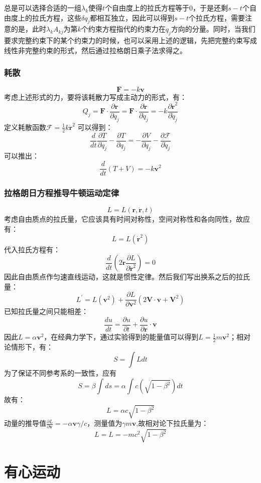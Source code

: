\documentclass[a4paper, 10pt, openany]{book}%
\begin{document}
    总是可以选择合适的一组$\lambda_k$使得$t$个自由度上的拉氏方程等于0，于是还剩$s-t$个自由度上的拉氏方程，这些$\delta q_j$都相互独立，因此可以得到$s-t$个拉氏方程，需要注意的是，此时$\lambda_kA_{kj}$为第$k$个约束方程指代的约束力在$q_j$方向的分量。同时，当我们要求完整约束下的某个约束力的时候，也可以采用上述的逻辑，先把完整约束写成线性非完整约束的形式，然后通过拉格朗日乘子法求得之。
     \subsection{耗散}
    $$\textbf{F}=-k\textbf{v}$$
    考虑上述形式的力，要将该耗散力写成主动力的形式，有：
     $$Q_j=\textbf{F}\cdot\frac{\partial \textbf{r}}{\partial q_j}=\textbf{F}\cdot\frac{\partial \dot{\textbf{r}}}{\partial \dot{q}_j}=-k\frac{\partial \dot{\textbf{r}}^2}{\partial \dot{q}_j}$$
    定义耗散函数$\mathcal{F}=\frac{1}{2}k\dot{\textbf{r}}^2$  可以得到：
    $$\frac{d}{dt}\frac{\partial T}{\partial \dot{q}_j}-\frac{\partial T}{\partial q_j}=-\frac{\partial V}{\partial \dot{q}_j}-\frac{\partial \mathcal{F}}{\partial \dot{q}_j}$$
    可以推出：
    $$\frac{d}{dt}(T+V)=-k\textbf{v}^2$$
    \subsection{拉格朗日方程推导牛顿运动定律}
    $$L=L(\textbf{r},\dot{\textbf{r}},t)$$
    考虑自由质点的拉氏量，它应该具有时间对称性，空间对称性和各向同性，故应有：
    $$L=L(\dot{\textbf{r}}^2)$$
    代入拉氏方程有：
    $$\frac{d}{dt}(2\dot{\textbf{r}}\frac{\partial L}{\partial \dot{\textbf{r}}^2})=0$$
    因此自由质点作匀速直线运动，这就是惯性定律。然后我们写出换系之后的拉氏量：
    $$L^\prime=L(\textbf{v}^2)+\frac{\partial L}{\partial \textbf{v}^2}(2\textbf{V}\cdot\textbf{v}+\textbf{V}^2)$$
    已知拉氏量之间只能相差：
    $$\frac{du}{dt}=\frac{\partial u}{\partial t}+\frac{\partial u}{\partial \textbf{r}}\cdot\textbf{v}$$
    因此$L=\alpha\textbf{v}^2$，在经典力学下，通过实验得到的能量值可以得到$L=\frac{1}{2}m\textbf{v}^2$；相对论情形下，有：
    $$S=\int Ldt$$
    为了保证不同参考系的一致性，应有
    $$S=\beta\int ds=\alpha\int c(\sqrt{1-\beta^2})dt$$
    故有：
    $$L=\alpha c \sqrt{1-\beta^2}$$
    动量的推导值$\frac{\partial L}{\partial \textbf{v}}=-\alpha \textbf{v}\gamma/c$，测量值为$\gamma m \textbf{v}$,故相对论下拉氏量为：
    $$L=L=-m c^2 \sqrt{1-\beta^2}$$
    \chapter{有心运动}
\end{document}
